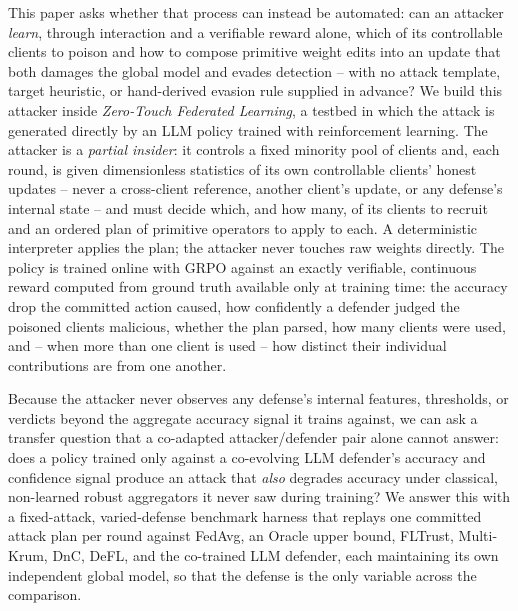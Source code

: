 \documentclass[conference]{IEEEtran}
\begin{document}
This paper asks whether that process can instead be automated: can an attacker \emph{learn}, through interaction and a verifiable reward alone, which of its controllable clients to poison and how to compose primitive weight edits into an update that both damages the global model and evades detection -- with no attack template, target heuristic, or hand-derived evasion rule supplied in advance? We build this attacker inside \emph{Zero-Touch Federated Learning}, a testbed in which the attack is generated directly by an LLM policy trained with reinforcement learning. The attacker is a \emph{partial insider}: it controls a fixed minority pool of clients and, each round, is given dimensionless statistics of its own controllable clients' honest updates -- never a cross-client reference, another client's update, or any defense's internal state -- and must decide which, and how many, of its clients to recruit and an ordered plan of primitive operators to apply to each. A deterministic interpreter applies the plan; the attacker never touches raw weights directly. The policy is trained online with GRPO \cite{grpo} against an exactly verifiable, continuous reward computed from ground truth available only at training time: the accuracy drop the committed action caused, how confidently a defender judged the poisoned clients malicious, whether the plan parsed, how many clients were used, and -- when more than one client is used -- how distinct their individual contributions are from one another.

Because the attacker never observes any defense's internal features, thresholds, or verdicts beyond the aggregate accuracy signal it trains against, we can ask a transfer question that a co-adapted attacker/defender pair alone cannot answer: does a policy trained only against a co-evolving LLM defender's accuracy and confidence signal produce an attack that \emph{also} degrades accuracy under classical, non-learned robust aggregators it never saw during training? We answer this with a fixed-attack, varied-defense benchmark harness that replays one committed attack plan per round against FedAvg, an Oracle upper bound, FLTrust, Multi-Krum, DnC, DeFL, and the co-trained LLM defender, each maintaining its own independent global model, so that the defense is the only variable across the comparison.
\end{document}
